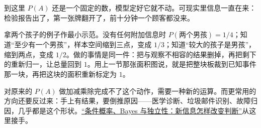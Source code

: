 到这里 \(P(A)\) 还是一个固定的数，模型定好它就不动。可现实里信息一直在来：检验报告出了，第一张牌翻开了，前十分钟一个顾客都没来。

拿两个孩子的例子作最小示范。没有任何附加信息时 \(P(\text{两个男孩})=1/4\)；知道``至少有一个男孩''，样本空间缩到三点，变成 \(1/3\)；知道``较大的孩子是男孩''，缩到两点，变成 \(1/2\)。做的事情是同一件：把与观察不相容的结果删掉，再把剩下的重新归一，让总量回到 \(1\)。用上一节那张面积图说，就是把整块板裁到已知事件那一块，再把这块的面积重新标定为 \(1\)。

对原来的 \(P(A)\) 做加减乘除完成不了这个动作，需要一种新的运算。而更常用的方向还要反过来：手上有结果，要倒推原因——医学诊断、垃圾邮件识别、故障归因，几乎都是这个形状。\hyperref[ch:038]{``条件概率、Bayes 与独立性：新信息怎样改变判断''}从这里接手。
